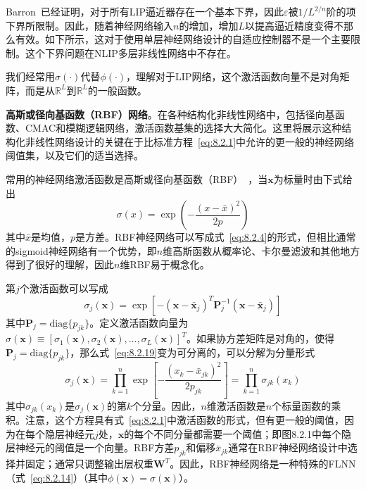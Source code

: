 \documentclass[12pt,a4paper]{ctexart}
\begin{document}
Barron~\cite{barron1993}已经证明，对于所有LIP逼近器存在一个基本下界，因此$\varepsilon$被$1/L^{2/n}$阶的项下界所限制。因此，随着神经网络输入$n$的增加，增加$L$以提高逼近精度变得不那么有效。如下所示，这对于使用单层神经网络设计的自适应控制器不是一个主要限制。这个下界问题在NLIP多层非线性网络中不存在。

我们经常用$\sigma(\cdot)$代替$\phi(\cdot)$，理解对于LIP网络，这个激活函数向量不是对角矩阵，而是从$\mathbb{R}^L$到$\mathbb{R}^L$的一般函数。

\textbf{高斯或径向基函数（RBF）网络}。在各种结构化非线性网络中，包括径向基函数、CMAC和模糊逻辑网络，激活函数基集的选择大大简化。这里将展示这种结构化非线性网络设计的关键在于比标准方程~\eqref{eq:8.2.1}中允许的更一般的神经网络阈值集，以及它们的适当选择。

常用的神经网络激活函数是高斯或径向基函数（RBF）~\cite{sanner1991}，当$\bm{x}$为标量时由下式给出
\begin{equation}\label{eq:8.2.18}
\sigma(x) = \exp\left(-\frac{(x-\bar{x})^2}{2p}\right)
\end{equation}
其中$\bar{x}$是均值，$p$是方差。RBF神经网络可以写成式~\eqref{eq:8.2.4}的形式，但相比通常的sigmoid神经网络有一个优势，即$n$维高斯函数从概率论、卡尔曼滤波和其他地方得到了很好的理解，因此$n$维RBF易于概念化。

第$j$个激活函数可以写成
\begin{equation}\label{eq:8.2.19}
\sigma_j(\bm{x}) = \exp\left[-(\bm{x}-\bar{\bm{x}}_j)^T \bm{P}_j^{-1}(\bm{x}-\bar{\bm{x}}_j)\right]
\end{equation}
其中$\bm{P}_j = \text{diag}\{p_{jk}\}$。定义激活函数向量为$\sigma(\bm{x}) \equiv [\sigma_1(\bm{x}), \sigma_2(\bm{x}), \ldots, \sigma_L(\bm{x})]^T$。如果协方差矩阵是对角的，使得$\bm{P}_j = \text{diag}\{p_{jk}\}$，那么式~\eqref{eq:8.2.19}变为可分离的，可以分解为分量形式
\begin{equation}\label{eq:8.2.20}
\sigma_j(\bm{x}) = \prod_{k=1}^{n} \exp\left[-\frac{(x_k-\bar{x}_{jk})^2}{2p_{jk}}\right] = \prod_{k=1}^{n} \sigma_{jk}(x_k)
\end{equation}
其中$\sigma_{jk}(x_k)$是$\sigma_j(\bm{x})$的第$k$个分量。因此，$n$维激活函数是$n$个标量函数的乘积。注意，这个方程具有式~\eqref{eq:8.2.1}中激活函数的形式，但有更一般的阈值，因为在每个隐层神经元$j$处，$\bm{x}$的每个不同分量都需要一个阈值；即图8.2.1中每个隐层神经元的阈值是一个向量。RBF方差$p_{jk}$和偏移$\bar{x}_{jk}$通常在RBF神经网络设计中选择并固定；通常只调整输出层权重$\bm{W}^T$。因此，RBF神经网络是一种特殊的FLNN（式~\eqref{eq:8.2.14}）（其中$\phi(\bm{x}) = \sigma(\bm{x})$）。
\end{document}
